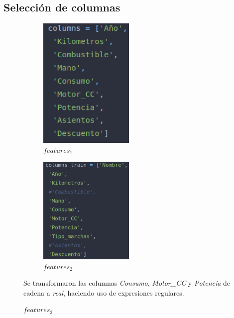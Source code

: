 \subsection{Selección de columnas}

\begin{figure}[H]

\begin{subfigure}{.5\textwidth}
  \centering
  \includegraphics[width=0.5\textwidth]{imagenes/cols1.png}
  \caption{$features_{1}$}
  \label{fig:sfig1}
\end{subfigure}%
\begin{subfigure}{.5\textwidth}
  \centering
  \includegraphics[width=0.5\textwidth]{imagenes/cols2.png}
  \caption{$features_{2}$}
  \label{fig:sfig2}
\end{subfigure}

Se transformaron las columnas \textit{Consumo}, \textit{Motor\_CC} y \textit{Potencia} de cadena a \textit{real}, haciendo uso de expresiones regulares.


\end{figure}
